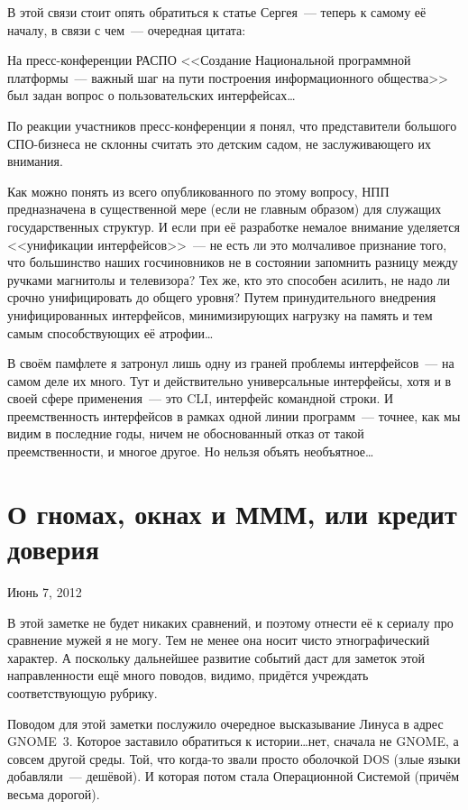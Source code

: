 В этой связи стоит опять обратиться к статье Сергея~--- теперь к самому её началу, в связи с чем~--- очередная цитата:
\begin{shadequote}{}
На пресс-конференции РАСПО <<Создание Национальной программной платформы~--- важный шаг на пути построения информационного общества>> был задан вопрос о пользовательских интерфейсах\dots

По реакции участников пресс-конференции я понял, что представители большого СПО-бизнеса не склонны считать это детским садом, не заслуживающего их внимания.
\end{shadequote}
Как можно понять из всего опубликованного по этому вопросу, НПП предназначена в существенной мере (если не главным образом) для служащих государственных структур. И если при её разработке немалое внимание уделяется <<унификации интерфейсов>>~--- не есть ли это молчаливое признание того, что большинство наших госчиновников не в состоянии запомнить разницу между ручками магнитолы и телевизора? Тех же, кто это способен асилить, не надо ли срочно унифицировать до общего уровня? Путем принудительного внедрения унифицированных интерфейсов, минимизирующих нагрузку на память и тем самым способствующих её атрофии\dots

В своём памфлете я затронул лишь одну из граней проблемы интерфейсов~--- на самом деле их много. Тут и действительно универсальные интерфейсы, хотя и в своей сфере применения~--- это CLI, интерфейс командной строки. И преемственность интерфейсов в рамках одной линии программ~--- точнее, как мы видим в последние годы, ничем не обоснованный отказ от такой преемственности, и многое другое. Но нельзя объять необъятное\dots

\section{О гномах, окнах и МММ, или кредит доверия} 
\begin{timeline}Июнь 7, 2012\end{timeline}

В этой заметке не будет никаких сравнений, и поэтому отнести её к сериалу про сравнение мужей я не могу. Тем не менее она носит чисто этнографический характер. А поскольку дальнейшее развитие событий даст для заметок этой направленности ещё много поводов, видимо, придётся учреждать соответствующую рубрику.

Поводом для этой заметки послужило очередное высказывание Линуса в адрес GNOME~3.  Которое заставило обратиться к истории\dots нет, сначала не GNOME, а совсем другой среды. Той, что когда-то звали просто оболочкой DOS (злые языки добавляли~--- дешёвой). И которая потом стала Операционной Системой (причём весьма дорогой).


